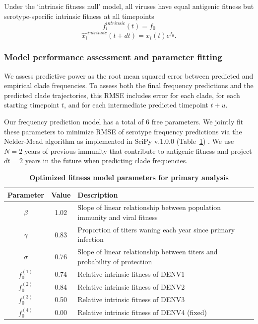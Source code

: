 \documentclass[11pt,oneside,letterpaper]{article}
\begin{document}
Under the `intrinsic fitness null' model, all viruses have equal antigenic fitness but serotype-specific intrinsic fitness at all timepoints
\begin{equation}
  \label{intrinsic_null}
  f_i^{intrinsic}(t) = f_0
\end{equation}
\begin{equation}
\hat{x_i}^{intrinsic}(t+dt) = x_i(t) e^{f_0}.
\end{equation}

\subsubsection*{Model performance assessment and parameter fitting}
We assess predictive power as the root mean squared error between predicted and empirical clade frequencies.
To assess both the final frequency predictions and the predicted clade trajectories, this RMSE includes error for each clade, for each starting timepoint $t$, and for each intermediate predicted timepoint $t+u$.

Our frequency prediction model has a total of 6 free parameters.
We jointly fit these parameters to minimize RMSE of serotype frequency predictions via the Nelder-Mead algorithm as implemented in SciPy v.1.0.0 (Table~\ref{fitness_model_parameters}) \citep{jones2001scipy,gao2012implementing}.
We use $N=2$ years of previous immunity that contribute to antigenic fitness and project $dt=2$ years in the future when predicting clade frequencies.

\begin{table}[ht!]
  \centering
  \caption{
    \textbf{Optimized fitness model parameters for primary analysis}
  }
  \label{fitness_model_parameters}
  \begin{tabular}{c c p{}}
    \hline
    Parameter     & Value & Description \\
    \hline
    $\beta$       & 1.02  & Slope of linear relationship between population immunity and viral fitness \\
    $\gamma$      & 0.83  &  Proportion of titers waning each year since primary infection \\
    $\sigma$      & 0.76  & Slope of linear relationship between titers and probability of protection \\
    $f_{0}^{(1)}$ & 0.74  & Relative intrinsic fitness of DENV1 \\
    $f_{0}^{(2)}$ & 0.84  & Relative intrinsic fitness of DENV2 \\
    $f_{0}^{(3)}$ & 0.50  & Relative intrinsic fitness of DENV3 \\
    $f_{0}^{(4)}$ & 0.00  & Relative intrinsic fitness of DENV4 (fixed) \\
    \hline
  \end{tabular}
\end{table}
\end{document}

